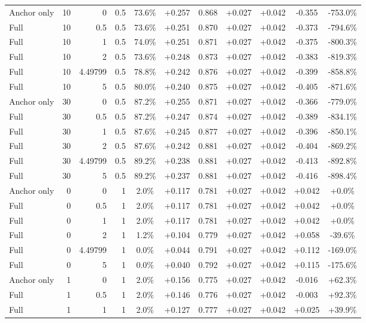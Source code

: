 \begin{table}[htbp]
\begin{tabular}{lrrrccccccc}
Anchor only & 10 & 0 & 0.5 & 73.6\% & +0.257 & 0.868 & +0.027 & +0.042 & -0.355 & -753.0\% \\
Full & 10 & 0.5 & 0.5 & 73.6\% & +0.251 & 0.870 & +0.027 & +0.042 & -0.373 & -794.6\% \\
Full & 10 & 1 & 0.5 & 74.0\% & +0.251 & 0.871 & +0.027 & +0.042 & -0.375 & -800.3\% \\
Full & 10 & 2 & 0.5 & 73.6\% & +0.248 & 0.873 & +0.027 & +0.042 & -0.383 & -819.3\% \\
Full & 10 & 4.49799 & 0.5 & 78.8\% & +0.242 & 0.876 & +0.027 & +0.042 & -0.399 & -858.8\% \\
Full & 10 & 5 & 0.5 & 80.0\% & +0.240 & 0.875 & +0.027 & +0.042 & -0.405 & -871.6\% \\
Anchor only & 30 & 0 & 0.5 & 87.2\% & +0.255 & 0.871 & +0.027 & +0.042 & -0.366 & -779.0\% \\
Full & 30 & 0.5 & 0.5 & 87.2\% & +0.247 & 0.874 & +0.027 & +0.042 & -0.389 & -834.1\% \\
Full & 30 & 1 & 0.5 & 87.6\% & +0.245 & 0.877 & +0.027 & +0.042 & -0.396 & -850.1\% \\
Full & 30 & 2 & 0.5 & 87.6\% & +0.242 & 0.881 & +0.027 & +0.042 & -0.404 & -869.2\% \\
Full & 30 & 4.49799 & 0.5 & 89.2\% & +0.238 & 0.881 & +0.027 & +0.042 & -0.413 & -892.8\% \\
Full & 30 & 5 & 0.5 & 89.2\% & +0.237 & 0.881 & +0.027 & +0.042 & -0.416 & -898.4\% \\
Anchor only & 0 & 0 & 1 & 2.0\% & +0.117 & 0.781 & +0.027 & +0.042 & +0.042 & +0.0\% \\
Full & 0 & 0.5 & 1 & 2.0\% & +0.117 & 0.781 & +0.027 & +0.042 & +0.042 & +0.0\% \\
Full & 0 & 1 & 1 & 2.0\% & +0.117 & 0.781 & +0.027 & +0.042 & +0.042 & +0.0\% \\
Full & 0 & 2 & 1 & 1.2\% & +0.104 & 0.779 & +0.027 & +0.042 & +0.058 & -39.6\% \\
Full & 0 & 4.49799 & 1 & 0.0\% & +0.044 & 0.791 & +0.027 & +0.042 & +0.112 & -169.0\% \\
Full & 0 & 5 & 1 & 0.0\% & +0.040 & 0.792 & +0.027 & +0.042 & +0.115 & -175.6\% \\
Anchor only & 1 & 0 & 1 & 2.0\% & +0.156 & 0.775 & +0.027 & +0.042 & -0.016 & +62.3\% \\
Full & 1 & 0.5 & 1 & 2.0\% & +0.146 & 0.776 & +0.027 & +0.042 & -0.003 & +92.3\% \\
Full & 1 & 1 & 1 & 2.0\% & +0.127 & 0.777 & +0.027 & +0.042 & +0.025 & +39.9\% \\

\end{tabular}
\end{table}
